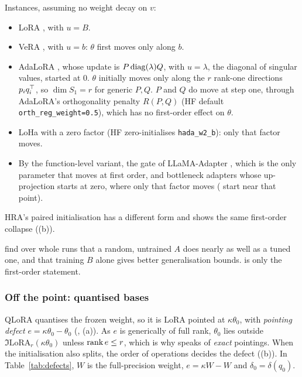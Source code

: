 Instances, assuming no weight decay on $v$:
\begin{itemize}
  \item LoRA \citep{hu2021lora}, with $u=B$.
  \item VeRA \citep{kopiczko2023vera}, with $u=b$: $\theta$ first moves only along $b$.
  \item AdaLoRA \citep{zhang2023adalora}, whose update is $P\operatorname{diag}(\lambda)Q$, with $u=\lambda$, the diagonal of
    singular values, started at $0$. $\theta$ initially moves only along the $r$ rank-one directions $p_iq_i^{\top}$, so $\dim S_1=r$ for
    generic $P,Q$. $P$ and $Q$ do move at step one, through AdaLoRA's orthogonality penalty $R(P,Q)$ (HF default
    \texttt{orth\_reg\_weight=0.5}), which has no first-order effect on $\theta$.
  \item LoHa \citep{hyeonwoo2021fedpara} with a zero factor (HF zero-initialises \texttt{hada\_w2\_b}): only that factor
    moves.
  \item By the function-level variant, the gate of LLaMA-Adapter \citep{zhang2023llama}, which is the only parameter
    that moves at first order, and bottleneck adapters whose up-projection starts at zero, where only that factor
    moves (\citet{houlsby2019parameter} start near that point).
\end{itemize}
HRA's paired initialisation has a different form and shows the same first-order collapse
((b)).

\citet{zhu2024asymmetry} find over whole runs that a random, untrained $A$ does nearly as well as a tuned one, and that
training $B$ alone gives better generalisation bounds.  is only the first-order statement.

\subsubsection{Off the point: quantised bases}\label{sec:strata-defect}

QLoRA \citep{dettmers2023qlora} quantises the frozen weight, so it is LoRA pointed at $\kappa\theta_0$, with
\emph{pointing defect} $e=\kappa\theta_0-\theta_0$ (, (a)). As $e$ is
generically of full rank, $\theta_0$ lies outside $\Im\mathrm{LoRA}_r(\kappa\theta_0)$ unless $\operatorname{rank} e\le r$, which is
why  speaks of \emph{exact} pointings. When the initialisation also splits, the order of
operations decides the defect ((b)). In Table~\ref{tab:defects}, $W$ is the full-precision
weight, $e=\kappa W-W$ and $\delta_0=\delta(q_0)$.

